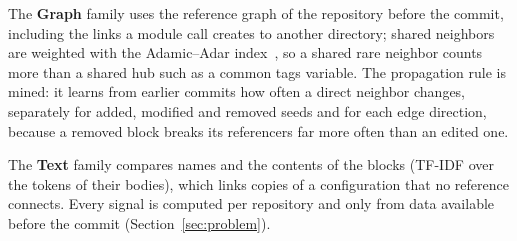 The \textbf{Graph} family uses the reference graph of the repository before the commit, including the links a module call creates to another directory; shared neighbors are weighted with the Adamic--Adar index~\cite{adamic2003friends}, so a shared rare neighbor counts more than a shared hub such as a common tags variable. The propagation rule is mined: it learns from earlier commits how often a direct neighbor changes, separately for added, modified and removed seeds and for each edge direction, because a removed block breaks its referencers far more often than an edited one.

The \textbf{Text} family compares names and the contents of the blocks (TF-IDF over the tokens of their bodies), which links copies of a configuration that no reference connects. Every signal is computed per repository and only from data available before the commit (Section~\ref{sec:problem}).

